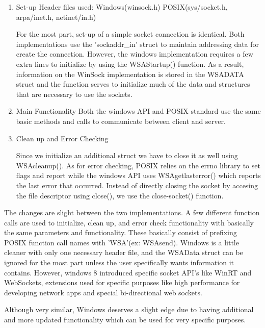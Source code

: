 \documentclass[letterpaper,10pt,titlepage]{article}
\begin{document}
\begin{enumerate}
  \item Set-up
Header files used: Windows(winsock.h)			POSIX(sys/socket.h, arpa/inet.h, netinet/in.h)

	For the most part, set-up of a simple socket connection is identical. Both implementations use the 'sockaddr\_in'
struct to maintain addressing data for create the connection. However, the windows implementation requires a few extra lines
to initialize by using the WSAStartup() function. As a result, information on the WinSock implementation is stored in the WSADATA
struct and the function serves to initialize much of the data and structures that are necessary to use the sockets.

  \item Main Functionality \newline
	Both the windows API and POSIX standard use the same basic methods and calls to communicate between
client and server.


  \item Clean up and Error Checking \newline 
  

	Since we initialize an additional struct we have to close it as well using WSAcleanup(). As for error 
checking, POSIX relies on the errno library to set flags and report while the windows API uses 
WSAgetlasterror() which reports the last error that occurred. Instead of directly closing the socket by
accesing the file descriptor using close(), we use the close-socket() function.

\end{enumerate}
	The changes are slight between the two implementations. A few different function calls are used to 
initialize, clean up, and error check functionality with basically the same parameters and functionality. These
basically consist of prefixing POSIX function call names with 'WSA'(ex: WSAsend). Windows is a little cleaner 
with only one necessary header file, and the WSAData struct can be ignored for the most part unless the user 
specifically wants information it contains. However, windows 8 introduced specific socket API's like WinRT 
and WebSockets, extensions used for specific purposes like high performance for developing network apps and special bi-directional web sockets.

Although very similar, Windows deserves a slight edge due to having additional and more updated functionality
which can be used for very specific purposes.
\end{document}
